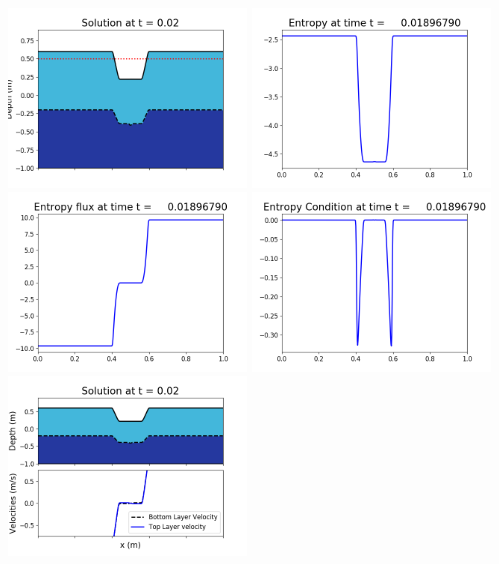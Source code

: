 \documentclass[11pt]{article}
\begin{document}
\includegraphics[width=0.475\textwidth]{frame0053fig1006.png}
\vskip 10pt 
\includegraphics[width=0.475\textwidth]{frame0053fig1007.png}
\includegraphics[width=0.475\textwidth]{frame0053fig1008.png}
\vskip 10pt 
\includegraphics[width=0.475\textwidth]{frame0053fig1009.png}
\vskip 10pt 
\includegraphics[width=0.475\textwidth]{frame0054fig1001.png}
\end{document}
